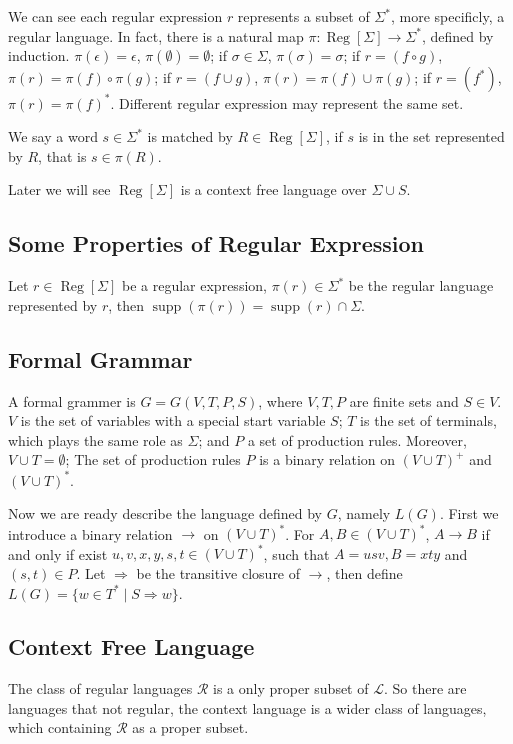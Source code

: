 \documentclass{article}
\def\supp{\mathop{\mathrm{supp}}}
\def\Reg{\mathop{\mathrm{Reg}}}
\begin{document}
We can see each regular expression $r$ represents a subset of $\Sigma^\ast$,
more specificly, a regular language.
In fact, there is a natural map $\pi : \Reg[\Sigma] \to \Sigma^\ast$, defined by induction.
$\pi(\epsilon) = \epsilon$, $\pi(\emptyset) = \emptyset$;
if $\sigma \in \Sigma$, $\pi(\sigma) = \sigma$;
if $r = (f \circ g)$, $\pi(r) = \pi(f) \circ \pi(g)$;
if $r = (f \cup g)$, $\pi(r) = \pi(f) \cup \pi(g)$;
if $r = (f^\ast)$, $\pi(r) = \pi(f)^\ast$.
Different regular expression may represent the same set.

We say a word $s \in \Sigma^\ast$ is matched by $R \in \Reg[\Sigma]$,
if $s$ is in the set represented by $R$, that is $s \in \pi(R)$.

Later we will see $\Reg[\Sigma]$ is a context free language over $\Sigma \cup S$.

\subsection{Some Properties of Regular Expression}
Let $r \in \Reg[\Sigma]$ be a regular expression,
$\pi(r) \in \Sigma^\ast$ be the regular language represented by $r$,
then $\supp(\pi(r)) = \supp(r) \cap \Sigma$.

\subsection{Formal Grammar}
A formal grammer is $G = G(V, T, P, S)$, where $V, T, P$ are finite sets and $S \in V$.
$V$ is the set of variables with a special start variable $S$;
$T$ is the set of terminals, which plays the same role as $\Sigma$;
and $P$ a set of production rules. Moreover, $V \cup T = \emptyset$;
The set of production rules $P$ is a binary relation on $(V \cup T)^+$ and $(V \cup T)^\ast$.

Now we are ready describe the language defined by $G$, namely $L(G)$.
First we introduce a binary relation $\to$ on $(V \cup T)^\ast$.
For $A, B \in (V \cup T)^\ast$,
$A \to B$ if and only if exist $u, v, x, y, s, t \in (V \cup T)^\ast$,
such that $A = usv, B = xty$ and $(s, t) \in P$.
Let $\Rightarrow$ be the transitive closure of $\to$,
then define $L(G) = \{w \in T^\ast \mid S \Rightarrow w\}$.

\subsection{Context Free Language}
The class of regular languages $\mathcal{R}$ is a only proper subset of $\mathcal{L}$.
So there are languages that not regular, the context language is a wider class of languages,
which containing $\mathcal{R}$ as a proper subset.
\end{document}
